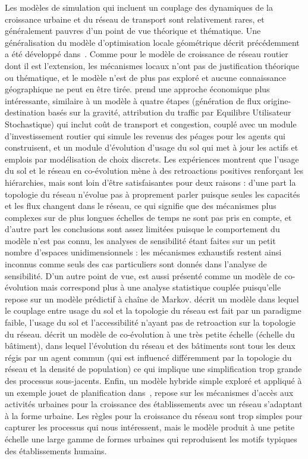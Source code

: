 {Les modèles de simulation qui incluent un couplage des dynamiques de la croissance urbaine et du réseau de transport sont relativement rares, et généralement pauvres d'un point de vue théorique et thématique. Une généralisation du modèle d'optimisation locale géométrique décrit précédemment a été développé dans~\cite{barthelemy2009co}. Comme pour le modèle de croissance de réseau routier dont il est l'extension, les mécanismes locaux n'ont pas de justification théorique ou thématique, et le modèle n'est de plus pas exploré et aucune connaissance géographique ne peut en être tirée. \cite{levinson2007co} prend une approche économique plus intéressante, similaire à un modèle à quatre étapes (génération de flux origine-destination basés sur la gravité, attribution du traffic par Equilibre Utilisateur Stochastique) qui inclut coût de transport et congestion, couplé avec un module d'investissement routier qui simule les revenus des péages pour les agents qui construisent, et un module d'évolution d'usage du sol qui met à jour les actifs et emplois par modélisation de choix discrets. Les expériences montrent que l'usage du sol et le réseau en co-évolution mène à des retroactions positives renforçant les hiérarchies, mais sont loin d'être satisfaisantes pour deux raisons : d'une part la topologie du réseau n'évolue pas à proprement parler puisque seules les capacités et les flux changent dans le réseau, ce qui signifie que des mécanismes plus complexes sur de plus longues échelles de temps ne sont pas pris en compte, et d'autre part les conclusions sont assez limitées puisque le comportement du modèle n'est pas connu, les analyses de sensibilité étant faites sur un petit nombre d'espaces unidimensionnels : les mécanismes exhaustifs restent ainsi inconnus comme seuls des cas particuliers sont donnés dans l'analyse de sensibilité. D'un autre point de vue, \cite{levinson2005paving} est aussi présenté comme un modèle de co-évolution mais correspond plus à une analyse statistique couplée puisqu'elle repose sur un modèle prédictif à chaîne de Markov. \cite{rui2011urban} décrit un modèle dans lequel le couplage entre usage du sol et la topologie du réseau est fait par un paradigme faible, l'usage du sol et l'accessibilité n'ayant pas de retroaction sur la topologie du réseau. \cite{achibet2014model} décrit un modèle de co-évolution à une très petite échelle (échelle du bâtiment), dans lequel l'évolution du réseau et des bâtiments sont tous les deux régis par un agent commun (qui est influencé différemment par la topologie du réseau et la densité de population) ce qui implique une simplification trop grande des processus sous-jacents. Enfin, un modèle hybride simple exploré et appliqué à un exemple jouet de planification dans~\cite{raimbault2014hybrid}, repose sur les mécanismes d'accès aux activités urbaines pour la croissance des établissements avec un réseau s'adaptant à la forme urbaine. Les règles pour la croissance du réseau sont trop simples pour capturer les processus qui nous intéressent, mais le modèle produit à une petite échelle une large gamme de formes urbaines qui reproduisent les motifs typiques des établissements humains.
}




